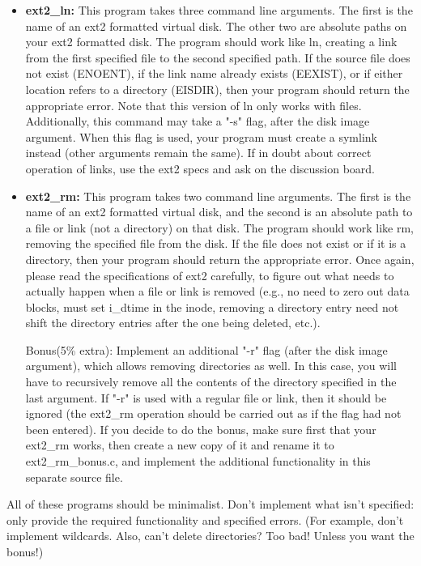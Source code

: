 \documentclass[12pt]{article}
\begin{document}
\begin{itemize}
    \item \textbf{ext2\_ln:} This program takes three command line arguments. The
    first is the name of an ext2 formatted virtual disk. The other two are absolute
    paths on your ext2 formatted disk. The program should work like ln, creating
    a link from the first specified file to the second specified path. If the
    source file does not exist (ENOENT), if the link name already exists
    (EEXIST), or if either location refers to a directory (EISDIR), then your
    program should return the appropriate error. Note that this version of ln
    only works with files. Additionally, this command may take a "-s" flag,
    after the disk image argument. When this flag is used, your program must
    create a symlink instead (other arguments remain the same). If in doubt
    about correct operation of links, use the ext2 specs and ask on the discussion
    board.

    \item \textbf{ext2\_rm:} This program takes two command line arguments. The
    first is the name of an ext2 formatted virtual disk, and the second is an
    absolute path to a file or link (not a directory) on that disk. The program
    should work like rm, removing the specified file from the disk. If the file
    does not exist or if it is a directory, then your program should return the
    appropriate error. Once again, please read the specifications of ext2
    carefully, to figure out what needs to actually happen when a file or link
    is removed (e.g., no need to zero out data blocks, must set i\_dtime in the
    inode, removing a directory entry need not shift the directory entries after
    the one being deleted, etc.).

    \bigskip

    Bonus(5\% extra): Implement an additional "-r" flag (after the disk image argument),
    which allows removing directories as well. In this case, you will have to recursively
    remove all the contents of the directory specified in the last argument. If "-r" is
    used with a regular file or link, then it should be ignored (the ext2\_rm
    operation should be carried out as if the flag had not been entered). If you
    decide to do the bonus, make sure first that your ext2\_rm works, then create
    a new copy of it and rename it to ext2\_rm\_bonus.c, and implement the
    additional functionality in this separate source file.
\end{itemize}

All of these programs should be minimalist. Don't implement what isn't specified:
only provide the required functionality and specified errors. (For example, don't
implement wildcards. Also, can't delete directories? Too bad! Unless you want the
bonus!)
\end{document}

